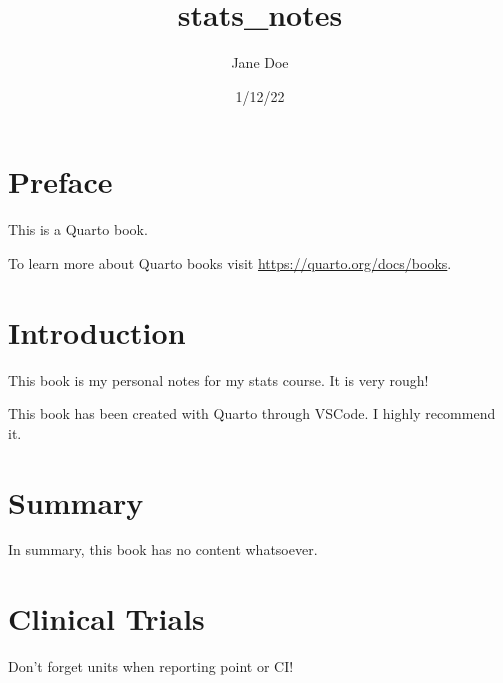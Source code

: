 \documentclass[
  letterpaper,
  DIV=11,
  numbers=noendperiod]{scrreprt}
\title{stats\_notes}
\author{Jane Doe}
\date{1/12/22}
\renewcommand*\contentsname{Table of contents}
\newcommand\contentsname{Table of contents}
\begin{document}
\maketitle
\ifdefined\Shaded\renewenvironment{Shaded}{\begin{tcolorbox}[frame hidden, enhanced, borderline west={3pt}{0pt}{shadecolor}, breakable, sharp corners, interior hidden, boxrule=0pt]}{\end{tcolorbox}}\fi

\renewcommand*\contentsname{Table of contents}
{
\hypersetup{linkcolor=}
\setcounter{tocdepth}{2}
\tableofcontents
}

\hypertarget{preface}{%
\chapter*{Preface}\label{preface}}


This is a Quarto book.

To learn more about Quarto books visit
\url{https://quarto.org/docs/books}.


\hypertarget{introduction}{%
\chapter{Introduction}\label{introduction}}

This book is my personal notes for my stats course. It is very rough!

This book has been created with Quarto through VSCode. I highly
recommend it.


\hypertarget{summary}{%
\chapter{Summary}\label{summary}}

In summary, this book has no content whatsoever.


\hypertarget{clinical-trials}{%
\chapter{Clinical Trials}\label{clinical-trials}}

Don't forget units when reporting point or CI!
\end{document}
